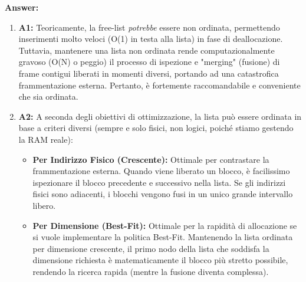 \textbf{Answer:}
\begin{enumerate}
    \item \textbf{A1:} Teoricamente, la free-list \textit{potrebbe} essere non ordinata, permettendo inserimenti molto veloci (O(1) in testa alla lista) in fase di deallocazione. Tuttavia, mantenere una lista non ordinata rende computazionalmente gravoso (O(N) o peggio) il processo di ispezione e "merging" (fusione) di frame contigui liberati in momenti diversi, portando ad una catastrofica frammentazione esterna. Pertanto, è fortemente raccomandabile e conveniente che sia ordinata.
    \item \textbf{A2:} A seconda degli obiettivi di ottimizzazione, la lista può essere ordinata in base a criteri diversi (sempre e solo fisici, non logici, poiché stiamo gestendo la RAM reale):
    \begin{itemize}
        \item \textbf{Per Indirizzo Fisico (Crescente):} Ottimale per contrastare la frammentazione esterna. Quando viene liberato un blocco, è facilissimo ispezionare il blocco precedente e successivo nella lista. Se gli indirizzi fisici sono adiacenti, i blocchi vengono fusi in un unico grande intervallo libero.
        \item \textbf{Per Dimensione (Best-Fit):} Ottimale per la rapidità di allocazione se si vuole implementare la politica Best-Fit. Mantenendo la lista ordinata per dimensione crescente, il primo nodo della lista che soddisfa la dimensione richiesta è matematicamente il blocco più stretto possibile, rendendo la ricerca rapida (mentre la fusione diventa complessa).
    \end{itemize}
\end{enumerate}
